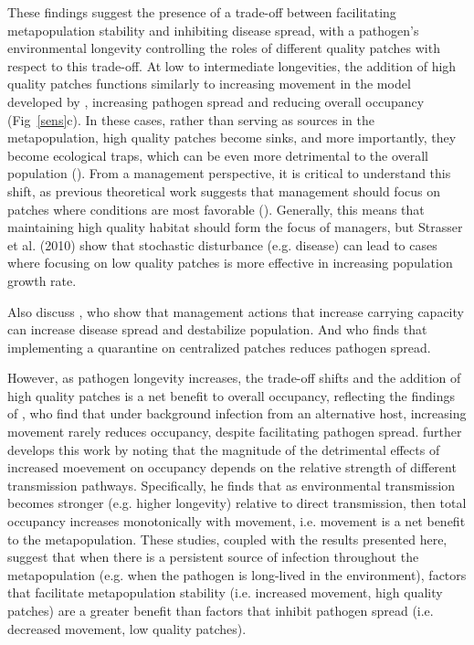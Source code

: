 \documentclass{svjour3}
\begin{document}
These findings suggest the presence of a trade-off between facilitating metapopulation stability and inhibiting disease spread, with a pathogen's environmental longevity controlling the roles of different quality patches with respect to this trade-off.  At low to intermediate longevities, the addition of high quality patches functions similarly to increasing movement in the model developed by \cite{Hess1996}, increasing pathogen spread and reducing overall occupancy (Fig~\ref{sens}c).  In these cases, rather than serving as sources in the metapopulation, high quality patches  become sinks, and more importantly, they become ecological traps, which can be even more detrimental to the overall population (\cite{Kristan2003}).  From a management perspective, it is critical to understand this shift, as previous theoretical work suggests that management should focus on patches where conditions are most favorable (\cite{Strasser2010}).  Generally, this means that maintaining high quality habitat should form the focus of managers, but Strasser et al. (2010) show that stochastic disturbance (e.g. disease) can lead to cases where focusing on low quality patches is more effective in increasing population growth rate.

Also discuss \cite{Sharp2011}, who show that management actions that increase carrying capacity can increase disease spread and destabilize population.  And \cite{Hess1996} who finds that implementing a quarantine on centralized patches reduces pathogen spread.

However, as pathogen longevity increases, the trade-off shifts and the addition of high quality patches is a net benefit to overall occupancy, reflecting the findings of \cite{Gog2002}, who find that under background infection from an alternative host, increasing movement rarely reduces occupancy, despite facilitating pathogen spread.  \cite{Park2012} further develops this work by noting that the magnitude of the detrimental effects of increased moevement on occupancy depends on the relative strength of different transmission pathways.  Specifically, he finds that as environmental transmission becomes stronger (e.g. higher longevity) relative to direct transmission, then total occupancy increases monotonically with movement, i.e. movement is a net benefit to the metapopulation.  These studies, coupled with the results presented here, suggest that when there is a persistent source of infection throughout the metapopulation (e.g. when the pathogen is long-lived in the environment), factors that facilitate metapopulation stability (i.e. increased movement, high quality patches) are a greater benefit than factors that inhibit pathogen spread (i.e. decreased movement, low quality patches).  
\end{document}

